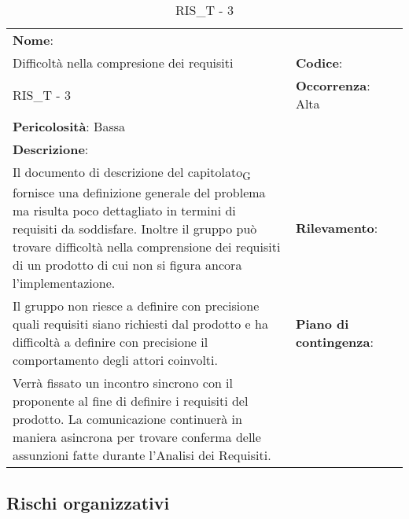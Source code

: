 \renewcommand{\arraystretch}{1.5}
\begin{longtable} { 
		>{\raggedright}p{} 
		>{\raggedright}p{} 
		>{\raggedright}p{}    }
	
	\caption{RIS\_T - 3} \endhead	
	
	
	\textbf{Nome}: \\ Difficoltà nella compresione dei requisiti
	& \textbf{Codice}: \\ RIS\_T - 3  
	& \textbf{Occorrenza}: Alta \\ \textbf{Pericolosità}: Bassa
	
	\tabularnewline
	
	\textbf{Descrizione}: \\ Il documento di descrizione del \gls{capitolato}\textsubscript{G} fornisce una definizione generale del problema ma risulta poco dettagliato in termini di requisiti da soddisfare. Inoltre il gruppo può trovare difficoltà nella comprensione dei requisiti di un prodotto di cui non si figura ancora l'implementazione.
	& 
	\textbf{Rilevamento}: \\ Il gruppo non riesce a definire con precisione quali requisiti siano richiesti dal prodotto e ha difficoltà a definire con precisione il comportamento degli attori coinvolti.
	
	&  
	\textbf{Piano di contingenza}: \\ Verrà fissato un incontro sincrono con il proponente al fine di definire i requisiti del prodotto. La comunicazione continuerà in maniera asincrona per trovare conferma delle assunzioni fatte durante l'Analisi dei Requisiti.
	
\end{longtable}

\newpage

\subsection{Rischi organizzativi}


